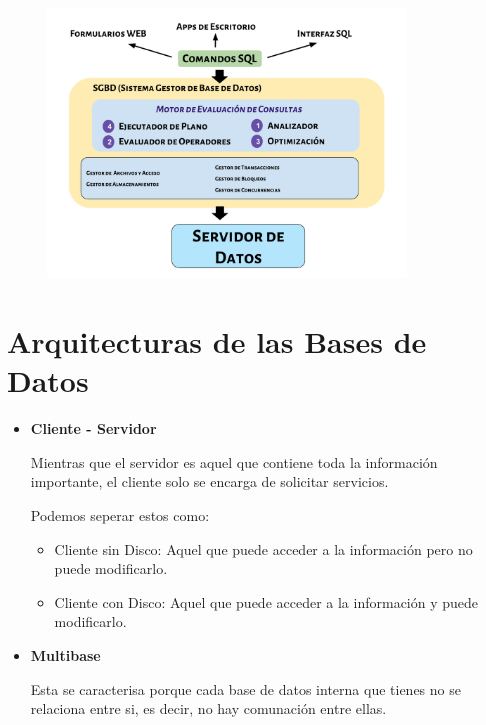 \documentclass[12pt, fleqn]{report}                             %
\begin{document}
            \begin{figure}[h]
                \centering
                \includegraphics[width=0.85\textwidth]{ArquitecturaSGBD.pdf}
            \end{figure}







        \clearpage
        \section{Arquitecturas de las Bases de Datos}


            \begin{itemize}

                \item
                    \textbf{Cliente - Servidor}

                    Mientras que el servidor es aquel que contiene toda la información 
                    importante, el cliente solo se encarga de solicitar servicios.

                    Podemos seperar estos como:
                    \begin{itemize}
                        \item Cliente sin Disco:
                            Aquel que puede acceder a la información pero no puede modificarlo.

                        \item Cliente con Disco:
                            Aquel que puede acceder a la información y puede modificarlo.
                     \end{itemize} 


                \item
                    \textbf{Multibase}

                    Esta se caracterisa porque cada base de datos interna que tienes no se relaciona
                    entre si, es decir, no hay comunación entre ellas.

                        
            \end{itemize}
\end{document}
